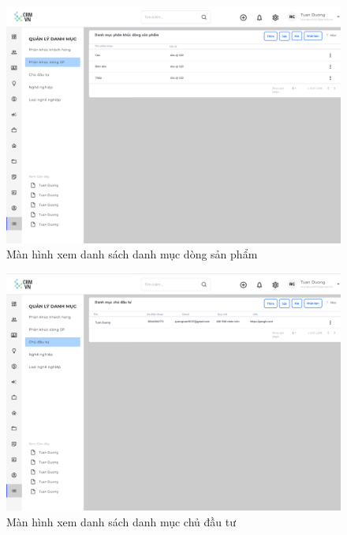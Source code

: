 \documentclass[12pt,a4paper]{article}
\begin{document}
\begin{enumerate}
\begin{itemize}
            \begin{figure}[H]
                \centering \includegraphics[width=\textwidth]{Img/Nguyet/Danhmuc/dmdsp.png}
                \vspace{0.5cm}
                \caption{Màn hình xem danh sách danh mục dòng sản phẩm }
                \label{dsp}
            \end{figure}

            \begin{figure}[H]
                \centering \includegraphics[width=\textwidth]{Img/Nguyet/Danhmuc/dscdt.png}
                \vspace{0.5cm}
                \caption{Màn hình xem danh sách danh mục chủ đầu tư }
                \label{cdt}
            \end{figure}


\end{itemize}
\end{enumerate}
\end{document}
